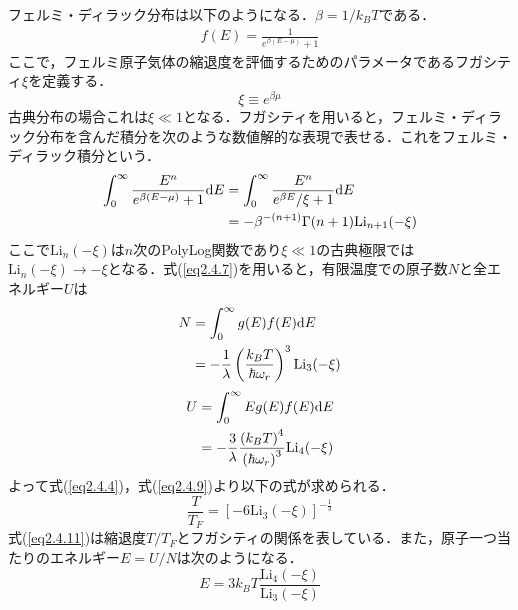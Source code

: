 \documentclass[11pt,a4j,notitlepage]{jreport}
\begin{document}
フェルミ・ディラック分布は以下のようになる．$\beta=1/k_B T$である．
\begin{align}
 	f(E) = \frac{1}{e^{\beta(E-\mu)}+1}
	\label{eq2.4.6}
\end{align}
ここで，フェルミ原子気体の縮退度を評価するためのパラメータであるフガシティ$\xi$を定義する．
\begin{equation}
	\xi \equiv e^{\beta \mu}
	\label{eq2.4.7}
\end{equation}
古典分布の場合これは$\xi \ll 1$となる．フガシティを用いると，フェルミ・ディラック分布を含んだ積分を次のような数値解的な表現で表せる．これをフェルミ・ディラック積分という．
\begin{align}
 	\int_{0}^{\infty} \frac{E^{n}}{e^{\beta(E-\mu)}+1} \mathrm{d} E
 	& = \int_{0}^{\infty} \frac{E^{n}}{e^{\beta E }/\xi +1} \mathrm{d} E \notag \\
 	& = - \beta^{ -( n+1 ) } \Gamma(n+1) \mathrm{Li}_{n+1}(- \xi )
	\label{eq2.4.8}
\end{align}
ここで$\mathrm{Li}_{n}(- \xi )$は$n$次のPolyLog関数であり$\xi \ll 1$の古典極限では$\mathrm{Li}_{n}(-\xi) \rightarrow -\xi$となる．式(\ref{eq2.4.7})を用いると，有限温度での原子数$N$と全エネルギー$U$は
\begin{align}
	N
	& = \int_{0}^{\infty} g(E) f(E) \mathrm{d} E \notag \\
	& =-\frac{1}{\lambda}\left(\frac{k_{B} T}{\hbar \omega_{r}}\right)^{3} \mathrm{Li}_{3}(- \xi)
	\label{eq2.4.9}
\end{align}
\begin{align}
	U
	& = \int_{0}^{\infty} E g(E) f(E) \mathrm{d} E \notag \\
	& = -\frac{3}{\lambda} \frac{\left(k_{B} T\right)^{4}}{\left(\hbar \omega_{r}\right)^{3}} \mathrm{Li}_{4}(- \xi)
	\label{eq2.4.10}
\end{align}
よって式(\ref{eq2.4.4})，式(\ref{eq2.4.9})より以下の式が求められる．
\begin{equation}
	\frac{T}{T_F} = \left[ - 6 \mathrm{Li}_3(- \xi) \right]^{-\frac{1}{3}}
	\label{eq2.4.11}
\end{equation}
式(\ref{eq2.4.11})は縮退度$T/T_F$とフガシティの関係を表している．また，原子一つ当たりのエネルギー$E=U/N$は次のようになる．
\begin{equation}
	E = 3k_BT \frac{\mathrm{Li}_4(- \xi)}{\mathrm{Li}_3(- \xi)}
	\label{eq2.4.12}
\end{equation}
\end{document}
